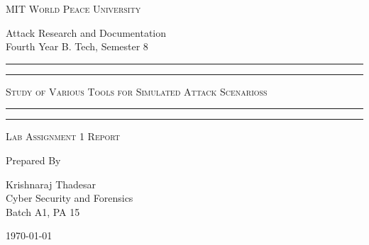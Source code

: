 \documentclass[11pt]{article}
\begin{document}
\begin{titlepage}
	\centering


	\huge\textsc{
		MIT World Peace University
	}\\

	\vspace{0.75\baselineskip} %

	\LARGE{
		Attack Research and Documentation\\
		Fourth Year B. Tech, Semester 8
	}

	\vfill %


	\rule{\textwidth}{1.6pt}\vspace*{-\baselineskip}\vspace*{2pt}
	\rule{\textwidth}{0.6pt}
	\vspace{0.75\baselineskip} %

	\huge{\textsc{
        Study of Various Tools for Simulated
            Attack Scenarioss
        }} \\

	\vspace{0.5\baselineskip} %
	\rule{\textwidth}{0.6pt}\vspace*{-\baselineskip}\vspace*{2.8pt}
	\rule{\textwidth}{1.6pt}

	\vspace{1\baselineskip} %


	\LARGE\textsc{
		Lab Assignment 1 Report
	} %
	\vfill


	Prepared By \vspace{0.5\baselineskip} %

	\Large{
		Krishnaraj Thadesar \\
		Cyber Security and Forensics\\
        Batch A1, PA 15
	}

	\vspace{0.5\baselineskip} %
	\today

\end{titlepage}
\end{document}
